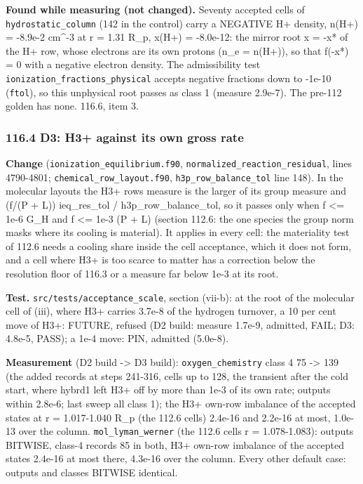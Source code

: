 \documentclass[english,a4paper]{my_memo}
\begin{document}
\textbf{Found while measuring (not changed).} Seventy accepted cells of
\texttt{hydrostatic\_column} (142 in the control) carry a NEGATIVE H+ density,
n(H+) = -8.9e-2 cm\^{}-3 at r = 1.31 R\_p, x(H+) = -8.0e-12: the mirror root
x = -x* of the H+ row, whose electrons are its own protons (n\_e = n(H+)), so
that f(-x*) = 0 with a negative electron density. The admissibility test
\texttt{ionization\_fractions\_physical} accepts negative fractions down to -1e-10
(\texttt{ftol}), so this unphysical root passes as class 1 (measure 2.9e-7). The
pre-112 golden has none. 116.6, item 3.

\subsubsection{116.4 D3: H3+ against its own gross rate}\label{1164-d3-h3-against-its-own-gross-rate}

\textbf{Change} (\texttt{ionization\_equilibrium.f90}, \texttt{normalized\_reaction\_residual},
lines 4790-4801; \texttt{chemical\_row\_layout.f90}, \texttt{h3p\_row\_balance\_tol} line 148).
In the molecular layouts the H3+ row\textquotesingle s measure is the larger of its group
measure and (\textbar f\textbar/(P + L)) ieq\_res\_tol / h3p\_row\_balance\_tol, so it passes
only when \textbar f\textbar{} \textless= 1e-6 G\_H and \textbar f\textbar{} \textless= 1e-3 (P + L) (section 112.6: the one
species the group norm masks where its cooling is material). It applies in
every cell: the materiality test of 112.6 needs a cooling share inside the
cell acceptance, which it does not form, and a cell where H3+ is too scarce
to matter has a correction below the resolution floor of 116.3 or a measure
far below 1e-3 at its root.

\textbf{Test.} \texttt{src/tests/acceptance\_scale}, section (vii-b): at the root of the
molecular cell of (iii), where H3+ carries 3.7e-8 of the hydrogen turnover, a
10 per cent move of H3+: FUTURE, refused (D2 build: measure 1.7e-9, admitted,
FAIL; D3: 4.8e-5, PASS); a 1e-4 move: PIN, admitted (5.0e-8).

\textbf{Measurement} (D2 build -\textgreater{} D3 build): \texttt{oxygen\_chemistry} class 4 75 -\textgreater{} 139
(the added records at steps 241-316, cells up to 128, the transient after
the cold start, where hybrd1 left H3+ off by more than 1e-3 of its own rate;
outputs within 2.8e-6; last sweep all class 1); the H3+ own-row imbalance of
the accepted states at r = 1.017-1.040 R\_p (the 112.6 cells) 2.4e-16 and
2.2e-16 at most, 1.0e-13 over the column. \texttt{mol\_lyman\_werner} (the 112.6 cells r = 1.078-1.083): outputs BITWISE, class-4 records 85 in both, H3+ own-row imbalance of the accepted states 2.4e-16 at most there, 4.3e-16 over the column. Every other default case:
outputs and classes BITWISE identical.
\end{document}
